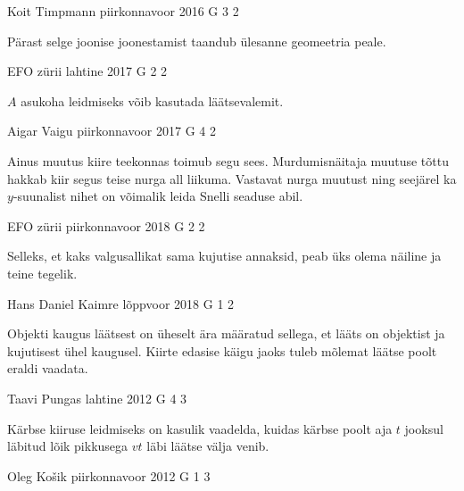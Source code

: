 \documentclass[11pt, twoside]{article}
\begin{document}
{%
{Koit Timpmann} %
{piirkonnavoor} %
{2016} %
{G 3} %
{2} %
{

\ifHint
Pärast selge joonise joonestamist taandub ülesanne geomeetria peale.
\fi
}

{EFO zürii} %
{lahtine} %
{2017} %
{G 2} %
{2} %
{

\ifHint
$A$ asukoha leidmiseks võib kasutada läätsevalemit.
\fi
}

{Aigar Vaigu} %
{piirkonnavoor} %
{2017} %
{G 4} %
{2} %
{

\ifHint
Ainus muutus kiire teekonnas toimub segu sees. Murdumisnäitaja muutuse tõttu hakkab kiir segus teise nurga all liikuma. Vastavat nurga muutust ning seejärel ka $y$-suunalist nihet on võimalik leida Snelli seaduse abil.
\fi
}

{EFO zürii} %
{piirkonnavoor} %
{2018} %
{G 2} %
{2} %
{

\ifHint
Selleks, et kaks valgusallikat sama kujutise annaksid, peab üks olema näiline ja teine tegelik.
\fi
}

{Hans Daniel Kaimre} %
{lõppvoor} %
{2018} %
{G 1} %
{2} %
{

\ifHint
Objekti kaugus läätsest on üheselt ära määratud sellega, et lääts on objektist ja kujutisest ühel kaugusel. Kiirte edasise käigu jaoks tuleb mõlemat läätse poolt eraldi vaadata.
\fi
}

{Taavi Pungas} %
{lahtine} %
{2012} %
{G 4} %
{3} %
{

\ifHint
Kärbse kiiruse leidmiseks on kasulik vaadelda, kuidas kärbse poolt aja $t$ jooksul läbitud lõik pikkusega $vt$ läbi läätse välja venib.
\fi
}

{Oleg Košik} %
{piirkonnavoor} %
{2012} %
{G 1} %
{3} %
{

}}
\end{document}
